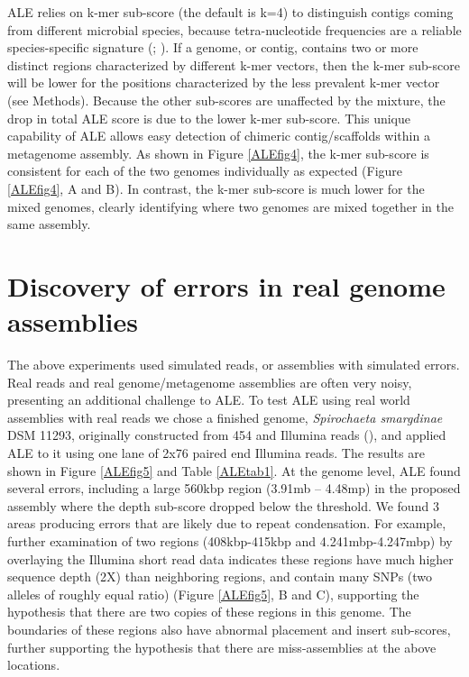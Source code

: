 \documentclass[phd,tocprelim]{cornell}
\begin{document}
ALE relies on k-mer sub-score (the default is k=4) to distinguish contigs coming from different microbial species, because tetra-nucleotide frequencies are a reliable species-specific signature (\cite{Teeling2004}; \cite{Woyke2006}). If a genome, or contig, contains two or more distinct regions characterized by different k-mer vectors, then the k-mer sub-score will be lower for the positions characterized by the less prevalent k-mer vector (see Methods). Because the other sub-scores are unaffected by the mixture, the drop in total ALE score is due to the lower k-mer sub-score. This unique capability of ALE allows easy detection of chimeric contig/scaffolds within a metagenome assembly. As shown in Figure \ref{ALEfig4}, the k-mer sub-score is consistent for each of the two genomes individually as expected (Figure \ref{ALEfig4}, A and B). In contrast, the k-mer sub-score is much lower for the mixed genomes, clearly identifying where two genomes are mixed together in the same assembly.

\section{Discovery of errors in real genome assemblies}
The above experiments used simulated reads, or assemblies with simulated errors. Real reads and real genome/metagenome assemblies are often very noisy, presenting an additional challenge to ALE. To test ALE using real world assemblies with real reads we chose a finished genome, {\it Spirochaeta smargdinae} DSM 11293, originally constructed from 454 and Illumina reads (\cite{Mavromatis2010}), and applied ALE to it using one lane of 2x76 paired end Illumina reads. The results are shown in Figure \ref{ALEfig5} and Table \ref{ALEtab1}. At the genome level, ALE found several errors, including a large 560kbp region (3.91mb – 4.48mp) in the proposed assembly where the depth sub-score dropped below the threshold. We found 3 areas producing errors that are likely due to repeat condensation. For example, further examination of two regions (408kbp-415kbp and 4.241mbp-4.247mbp) by overlaying the Illumina short read data indicates these regions have much higher sequence depth (2X) than neighboring regions, and contain many SNPs (two alleles of roughly equal ratio) (Figure \ref{ALEfig5}, B and C), supporting the hypothesis that there are two copies of these regions in this genome. The boundaries of these regions also have abnormal placement and insert sub-scores, further supporting the hypothesis that there are miss-assemblies at the above locations.
\end{document}
